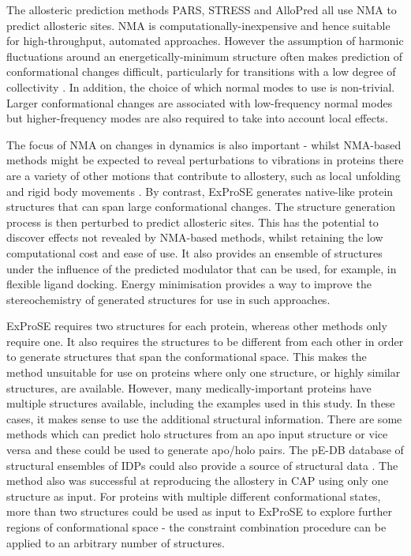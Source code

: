 The allosteric prediction methods PARS, STRESS and AlloPred all use NMA to predict allosteric sites.
NMA is computationally-inexpensive and hence suitable for high-throughput, automated approaches.
However the assumption of harmonic fluctuations around an energetically-minimum structure often makes prediction of conformational changes difficult, particularly for transitions with a low degree of collectivity \cite{Yang2007}.
In addition, the choice of which normal modes to use is non-trivial.
Larger conformational changes are associated with low-frequency normal modes but higher-frequency modes are also required to take into account local effects.

The focus of NMA on changes in dynamics is also important - whilst NMA-based methods might be expected to reveal perturbations to vibrations in proteins there are a variety of other motions that contribute to allostery, such as local unfolding and rigid body movements \cite{Motlagh2014}.
By contrast, ExProSE generates native-like protein structures that can span large conformational changes.
The structure generation process is then perturbed to predict allosteric sites.
This has the potential to discover effects not revealed by NMA-based methods, whilst retaining the low computational cost and ease of use.
It also provides an ensemble of structures under the influence of the predicted modulator that can be used, for example, in flexible ligand docking.
Energy minimisation provides a way to improve the stereochemistry of generated structures for use in such approaches.

ExProSE requires two structures for each protein, whereas other methods only require one.
It also requires the structures to be different from each other in order to generate structures that span the conformational space.
This makes the method unsuitable for use on proteins where only one structure, or highly similar structures, are available.
However, many medically-important proteins have multiple structures available, including the examples used in this study.
In these cases, it makes sense to use the additional structural information.
There are some methods which can predict holo structures from an apo input structure or vice versa \cite{Seeliger2010, Grove2013, Kidd2009} and these could be used to generate apo/holo pairs.
The pE-DB database of structural ensembles of IDPs could also provide a source of structural data \cite{Varadi2014}.
The method also was successful at reproducing the allostery in CAP using only one structure as input.
For proteins with multiple different conformational states, more than two structures could be used as input to ExProSE to explore further regions of conformational space - the constraint combination procedure can be applied to an arbitrary number of structures.

